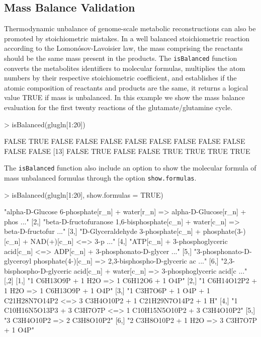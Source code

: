 \subsection*{Mass Balance Validation}
Thermodynamic unbalance of genome-scale metabolic reconstructions can also be promoted by stoichiometric mistakes. In a well balanced stoichiometric reaction according to the Lomonósov-Lavoisier law, the mass comprising the reactants should be the same mass present in the products. The \texttt{\mbox{isBalanced}} function converts the metabolites identifiers to molecular formulas, multiplies the atom numbers by their respective stoichiometric coefficient, and establishes  if the atomic composition of reactants and products are the same, it returns a logical value TRUE if mass is unbalanced. In this example we show the mass balance evaluation for the first twenty reactions of the glutamate/glutamine cycle.
\begin{Schunk}
\begin{Sinput}
> isBalanced(glugln[1:20])
\end{Sinput}
\begin{Soutput}
 [1] FALSE  TRUE FALSE FALSE FALSE FALSE FALSE FALSE FALSE FALSE FALSE FALSE
[13] FALSE  TRUE FALSE FALSE  TRUE  TRUE  TRUE  TRUE
\end{Soutput}
The \texttt{isBalanced} function also include an option to show the molecular formula of mass unbalanced formulas through the option \texttt{show.formulas}.
\begin{Sinput}
> isBalanced(glugln[1:20], show.formulas = TRUE)
\end{Sinput}
\begin{Soutput}
     [,1]
[1,] "alpha-D-Glucose 6-phosphate[r_n] + water[r_n] => alpha-D-Glucose[r_n] + phos ..."
[2,] "beta-D-fructofuranose 1,6-bisphosphate[c_n] + water[c_n] => beta-D-fructofur ..."
[3,] "D-Glyceraldehyde 3-phosphate[c_n] + phosphate(3-)[c_n] + NAD(+)[c_n] <=> 3-p ..."
[4,] "ATP[c_n] + 3-phosphoglyceric acid[c_n] <=> ADP[c_n] + 3-phosphonato-D-glycer ..."
[5,] "3-phosphonato-D-glyceroyl phosphate(4-)[c_n] => 2,3-bisphospho-D-glyceric ac ..."
[6,] "2,3-bisphospho-D-glyceric acid[c_n] + water[c_n] => 3-phosphoglyceric acid[c ..."
     [,2]
[1,] "1 C6H13O9P + 1 H2O => 1 C6H12O6 + 1 O4P"
[2,] "1 C6H14O12P2 + 1 H2O => 1 C6H13O9P + 1 O4P"
[3,] "1 C3H7O6P + 1 O4P + 1 C21H28N7O14P2 <=> 3 C3H4O10P2 + 1 C21H29N7O14P2 + 1 H"
[4,] "1 C10H16N5O13P3 + 3 C3H7O7P <=> 1 C10H15N5O10P2 + 3 C3H4O10P2"
[5,] "3 C3H4O10P2 => 2 C3H8O10P2"
[6,] "2 C3H8O10P2 + 1 H2O => 3 C3H7O7P + 1 O4P"
\end{Soutput}
\end{Schunk}

